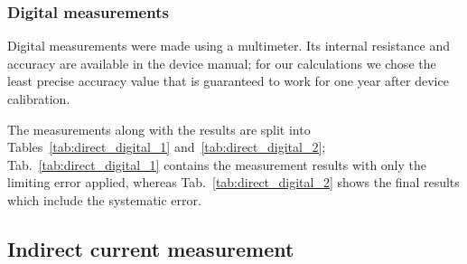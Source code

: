 \subsubsection{Digital measurements}

Digital measurements were made using a multimeter. Its internal resistance and accuracy are available in the device manual; for our calculations we chose the least precise accuracy value that is guaranteed to work for one year after device calibration.

The measurements along with the results are split into Tables~\ref{tab:direct_digital_1} and~\ref{tab:direct_digital_2}; Tab.~\ref{tab:direct_digital_1} contains the measurement results with only the limiting error applied, whereas Tab.~\ref{tab:direct_digital_2} shows the final results which include the systematic error.

\subsection{Indirect current measurement}